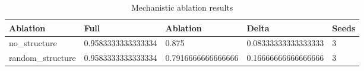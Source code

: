 \begin{table}[t]
\centering
\caption{Mechanistic ablation results}
\begin{tabular}{lllll}
\toprule
Ablation & Full & Ablation & Delta & Seeds \\ 
\midrule
no\_structure & 0.9583333333333334 & 0.875 & 0.08333333333333333 & 3 \\ 
random\_structure & 0.9583333333333334 & 0.7916666666666666 & 0.16666666666666666 & 3 \\ 
\bottomrule
\end{tabular}
\end{table}
